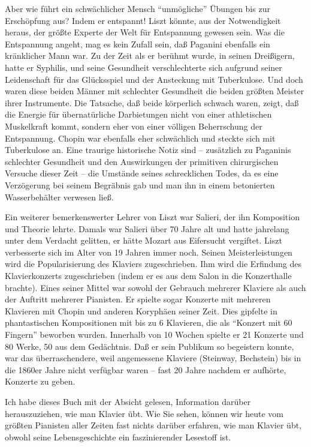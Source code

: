 Aber wie führt ein schwächlicher Mensch \enquote{unmögliche} Übungen bis zur Erschöpfung aus?
Indem er entspannt!
Liszt könnte, aus der Notwendigkeit heraus, der größte Experte der Welt für Entspannung gewesen sein.
Was die Entspannung angeht, mag es kein Zufall sein, daß Paganini ebenfalls ein kränklicher Mann war.
Zu der Zeit als er berühmt wurde, in seinen Dreißigern, hatte er Syphilis, und seine Gesundheit verschlechterte sich aufgrund seiner Leidenschaft für das Glücksspiel und der Ansteckung mit Tuberkulose.
Und doch waren diese beiden Männer mit schlechter Gesundheit die beiden größten Meister ihrer Instrumente.
Die Tatsache, daß beide körperlich schwach waren, zeigt, daß die Energie für übernatürliche Darbietungen nicht von einer athletischen Muskelkraft kommt, sondern eher von einer völligen Beherrschung der Entspannung.
Chopin war ebenfalls eher schwächlich und steckte sich mit Tuberkulose an.
Eine traurige historische Notiz sind -- zusätzlich zu Paganinis schlechter Gesundheit und den Auswirkungen der primitiven chirurgischen Versuche dieser Zeit -- die Umstände seines schrecklichen Todes, da es eine Verzögerung bei seinem Begräbnis gab und man ihn in einem betonierten Wasserbehälter verwesen ließ.

Ein weiterer bemerkenswerter Lehrer von Liszt war Salieri, der ihn Komposition und Theorie lehrte.
Damals war Salieri über 70 Jahre alt und hatte jahrelang unter dem Verdacht gelitten, er hätte Mozart aus Eifersucht vergiftet.
Liszt verbesserte sich im Alter von 19 Jahren immer noch.
Seinen Meisterleistungen wird die Popularisierung des Klaviers zugeschrieben.
Ihm wird die Erfindung des Klavierkonzerts zugeschrieben (indem er es aus dem Salon in die Konzerthalle brachte).
Eines seiner Mittel war sowohl der Gebrauch mehrerer Klaviere als auch der Auftritt mehrerer Pianisten.
Er spielte sogar Konzerte mit mehreren Klavieren mit Chopin und anderen Koryphäen seiner Zeit.
Dies gipfelte in phantastischen Kompositionen mit bis zu 6 Klavieren, die als \enquote{Konzert mit 60 Fingern} beworben wurden.
Innerhalb von 10 Wochen spielte er 21 Konzerte und 80 Werke, 50 aus dem Gedächtnis.
Daß er sein Publikum so begeistern konnte, war das überraschendere, weil angemessene Klaviere (Steinway, Bechstein) bis in die 1860er Jahre nicht verfügbar waren -- fast 20 Jahre nachdem er aufhörte, Konzerte zu geben.

Ich habe dieses Buch mit der Absicht gelesen, Information darüber herauszuziehen, wie man Klavier übt.
 Wie Sie sehen, können wir heute vom größten Pianisten aller Zeiten fast nichts darüber erfahren,
 wie man Klavier übt, obwohl seine Lebensgeschichte ein faszinierender Lesestoff ist.


